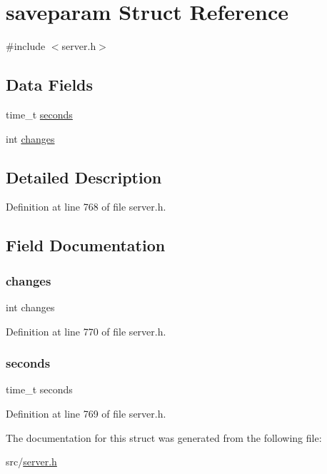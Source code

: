 \hypertarget{structsaveparam}{}\section{saveparam Struct Reference}
\label{structsaveparam}


{\ttfamily \#include $<$server.\+h$>$}

\subsection*{Data Fields}
\begin{DoxyCompactItemize}
\item 
time\+\_\+t \hyperlink{structsaveparam_ae112d79896ed83ac05e155da60e85523}{seconds}
\item 
int \hyperlink{structsaveparam_a428798c15a127930411bd3af43e3cdc7}{changes}
\end{DoxyCompactItemize}


\subsection{Detailed Description}


Definition at line 768 of file server.\+h.



\subsection{Field Documentation}
\mbox{\label{structsaveparam_a428798c15a127930411bd3af43e3cdc7}} 
\subsubsection{\texorpdfstring{changes}{changes}}
{\footnotesize\ttfamily int changes}



Definition at line 770 of file server.\+h.

\mbox{\label{structsaveparam_ae112d79896ed83ac05e155da60e85523}} 
\subsubsection{\texorpdfstring{seconds}{seconds}}
{\footnotesize\ttfamily time\+\_\+t seconds}



Definition at line 769 of file server.\+h.



The documentation for this struct was generated from the following file\+:\begin{DoxyCompactItemize}
\item 
src/\hyperlink{server_8h}{server.\+h}\end{DoxyCompactItemize}
